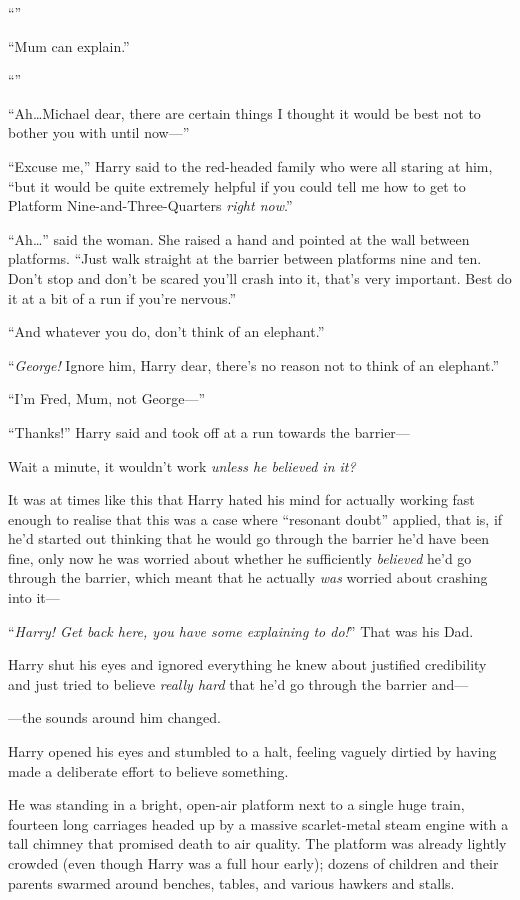“”

“Mum can explain.”

“”

“Ah…Michael dear, there are certain things I thought it would be best not to bother you with until now—”

“Excuse me,” Harry said to the red-headed family who were all staring at him, “but it would be quite extremely helpful if you could tell me how to get to Platform Nine-and-Three-Quarters \emph{right now}.”

“Ah…” said the woman. She raised a hand and pointed at the wall between platforms. “Just walk straight at the barrier between platforms nine and ten. Don’t stop and don’t be scared you’ll crash into it, that’s very important. Best do it at a bit of a run if you’re nervous.”

“And whatever you do, don’t think of an elephant.”

“\emph{George!} Ignore him, Harry dear, there’s no reason not to think of an elephant.”

“I’m Fred, Mum, not George—”

“Thanks!” Harry said and took off at a run towards the barrier—

Wait a minute, it wouldn’t work \emph{unless he believed in it?}

It was at times like this that Harry hated his mind for actually working fast enough to realise that this was a case where “resonant doubt” applied, that is, if he’d started out thinking that he would go through the barrier he’d have been fine, only now he was worried about whether he sufficiently \emph{believed} he’d go through the barrier, which meant that he actually \emph{was} worried about crashing into it—

“\emph{Harry! Get back here, you have some explaining to do!}” That was his Dad.

Harry shut his eyes and ignored everything he knew about justified credibility and just tried to believe \emph{really hard} that he’d go through the barrier and—

—the sounds around him changed.

Harry opened his eyes and stumbled to a halt, feeling vaguely dirtied by having made a deliberate effort to believe something.

He was standing in a bright, open-air platform next to a single huge train, fourteen long carriages headed up by a massive scarlet-metal steam engine with a tall chimney that promised death to air quality. The platform was already lightly crowded (even though Harry was a full hour early); dozens of children and their parents swarmed around benches, tables, and various hawkers and stalls.

